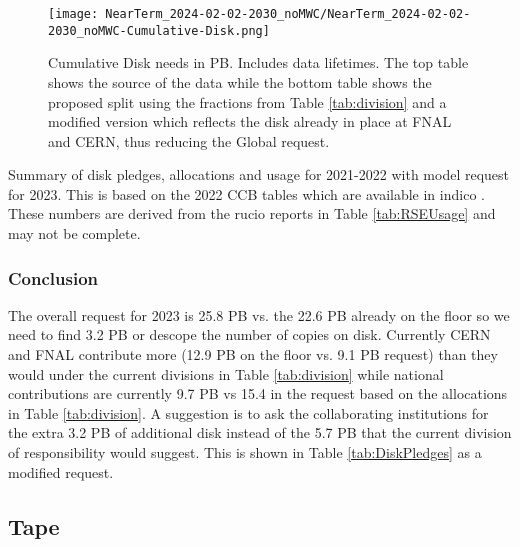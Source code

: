 \documentclass[12pt]{article}
\begin{document}

\begin{figure}[h]
\centering\texttt{[image: NearTerm\_2024-02-02-2030\_noMWC/NearTerm\_2024-02-02-2030\_noMWC-Cumulative-Disk.png]}
\caption{Cumulative Disk needs in PB. Includes data lifetimes.  The top table shows the source of the data while the bottom table  shows the proposed split using the fractions from Table \ref{tab:division} and a modified version which reflects the disk already in place at FNAL and CERN, thus reducing the Global request. }\label{fig:Cumulative-Disk}
\end{figure}




\begin{table}[ht]
\centering{}
\caption{Summary of disk pledges, allocations and usage for 2021-2022 with model request for 2023.  This is based on the 2022 CCB tables which are available in indico  \cite{CCB2022,CCB2023}.  These numbers are derived from the rucio reports in Table \ref{tab:RSEUsage} and may not be complete.  }
\label{tab:DiskPledges}
\end{table}

\subsubsection{Conclusion}\label{sec:diskresult}
The overall request for 2023 is 25.8 PB vs. the 22.6 PB already on the floor so we need to find 3.2 PB or descope the number of copies on disk. Currently CERN and FNAL contribute more  (12.9 PB on the floor vs. 9.1 PB request) than they would under the current divisions in Table \ref{tab:division} while national contributions are currently 9.7 PB vs 15.4 in the request based on the allocations in Table \ref{tab:division}.   A suggestion is to ask the collaborating institutions for the extra  3.2 PB of additional disk instead of the 5.7 PB that the current division of responsibility would suggest.  This is shown in Table \ref{tab:DiskPledges} as a modified request.


\clearpage
\subsection{Tape}
\end{document}
